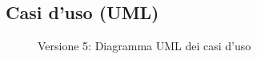 \begin{landscape}
    \subsection{Casi d'uso (UML)}
    \vfill
    \begin{figure}[H]
        \centering
        \caption{Versione 5: Diagramma UML dei casi d'uso}
        \label{fig:use_case_uml_v5}
    \end{figure}
\end{landscape}
